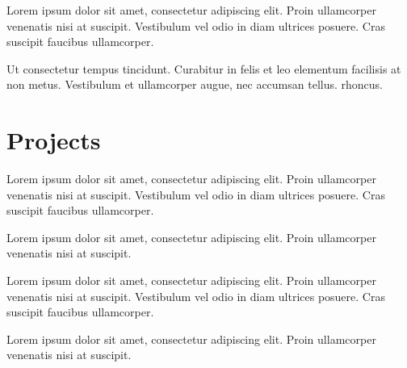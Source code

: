 \documentclass{stationery-resume}
\begin{document}
\begin{minipage}[t]{0.70\textwidth}
\begin{tightemize}
\sectionsep
\item Lorem ipsum dolor sit amet, consectetur adipiscing elit. Proin ullamcorper venenatis nisi at suscipit. Vestibulum vel odio in diam ultrices posuere. Cras suscipit faucibus ullamcorper.
\item Ut consectetur tempus tincidunt. Curabitur in felis et leo elementum facilisis at non metus. Vestibulum et ullamcorper augue, nec accumsan tellus.
 rhoncus.
\end{tightemize}

\sectionsep
{\color{primary}\hrulefill}


\section{Projects}

\begin{tightemize}
\item Lorem ipsum dolor sit amet, consectetur adipiscing elit. Proin ullamcorper venenatis nisi at suscipit. Vestibulum vel odio in diam ultrices posuere. Cras suscipit faucibus ullamcorper.
\item Lorem ipsum dolor sit amet, consectetur adipiscing elit. Proin ullamcorper venenatis nisi at suscipit.
\end{tightemize}
\sectionsep

\begin{tightemize}
\item Lorem ipsum dolor sit amet, consectetur adipiscing elit. Proin ullamcorper venenatis nisi at suscipit. Vestibulum vel odio in diam ultrices posuere. Cras suscipit faucibus ullamcorper. 
\item Lorem ipsum dolor sit amet, consectetur adipiscing elit. Proin ullamcorper venenatis nisi at suscipit.
\end{tightemize}
\sectionsep


%
%

\end{minipage} 
\end{document}
